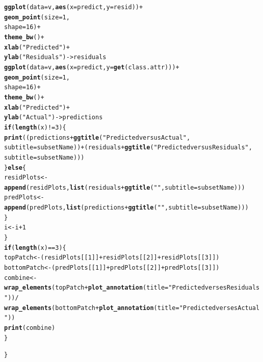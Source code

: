 \documentclass{article}\usepackage[]{graphicx}\usepackage[]{xcolor}
\makeatletter
\newcommand{\hlnum}[1]{\textcolor[rgb]{0.686,0.059,0.569}{#1}}%
\newcommand{\hlstr}[1]{\textcolor[rgb]{0.192,0.494,0.8}{#1}}%
\newcommand{\hlopt}[1]{\textcolor[rgb]{0,0,0}{#1}}%
\newcommand{\hlstd}[1]{\textcolor[rgb]{0.345,0.345,0.345}{#1}}%
\newcommand{\hlkwa}[1]{\textcolor[rgb]{0.161,0.373,0.58}{\textbf{#1}}}%
\newcommand{\hlkwb}[1]{\textcolor[rgb]{0.69,0.353,0.396}{#1}}%
\newcommand{\hlkwc}[1]{\textcolor[rgb]{0.333,0.667,0.333}{#1}}%
\newcommand{\hlkwd}[1]{\textcolor[rgb]{0.737,0.353,0.396}{\textbf{#1}}}%
\newenvironment{kframe}{%
 \def\at@end@of@kframe{}%
 \ifinner\ifhmode%
  \def\at@end@of@kframe{\end{minipage}}%
  \begin{minipage}{\columnwidth}%
 \fi\fi%
 \def\FrameCommand##1{\hskip\@totalleftmargin \hskip-\fboxsep
 \colorbox{shadecolor}{##1}\hskip-\fboxsep
     \hskip-\linewidth \hskip-\@totalleftmargin \hskip\columnwidth}%
 \MakeFramed {\advance\hsize-\width
   \@totalleftmargin\z@ \linewidth\hsize
   \@setminipage}}%
 {\par\unskip\endMakeFramed%
 \at@end@of@kframe}
\newenvironment{knitrout}{}{} %
\makeatother
\begin{document}
\begin{knitrout}
\begin{kframe}
\begin{alltt}
    \hlkwd{ggplot}\hlstd{(}\hlkwc{data}\hlstd{=v,} \hlkwd{aes}\hlstd{(}\hlkwc{x}\hlstd{=predict,} \hlkwc{y}\hlstd{=resid))} \hlopt{+}
      \hlkwd{geom_point}\hlstd{(}\hlkwc{size}\hlstd{=}\hlnum{1}\hlstd{,}
                 \hlkwc{shape}\hlstd{=}\hlnum{16}\hlstd{)}\hlopt{+}
      \hlkwd{theme_bw}\hlstd{()}\hlopt{+}
      \hlkwd{xlab}\hlstd{(}\hlstr{"Predicted"}\hlstd{)}\hlopt{+}
      \hlkwd{ylab}\hlstd{(}\hlstr{"Residuals"}\hlstd{)}\hlkwb{->} \hlstd{residuals}
    \hlkwd{ggplot}\hlstd{(}\hlkwc{data}\hlstd{=v,} \hlkwd{aes}\hlstd{(}\hlkwc{x}\hlstd{=predict,} \hlkwc{y}\hlstd{=}\hlkwd{get}\hlstd{(class.attr)))} \hlopt{+}
      \hlkwd{geom_point}\hlstd{(}\hlkwc{size}\hlstd{=}\hlnum{1}\hlstd{,}
                 \hlkwc{shape}\hlstd{=}\hlnum{16}\hlstd{)}\hlopt{+}
      \hlkwd{theme_bw}\hlstd{()}\hlopt{+}
      \hlkwd{xlab}\hlstd{(}\hlstr{"Predicted"}\hlstd{)}\hlopt{+}
      \hlkwd{ylab}\hlstd{(}\hlstr{"Actual"}\hlstd{)} \hlkwb{->} \hlstd{predictions}
    \hlkwa{if} \hlstd{(}\hlkwd{length}\hlstd{(x)} \hlopt{!=} \hlnum{3}\hlstd{) \{}
      \hlkwd{print}\hlstd{((predictions} \hlopt{+} \hlkwd{ggtitle}\hlstd{(}\hlstr{"Predicted versus Actual"}\hlstd{,}
           \hlkwc{subtitle}\hlstd{=subsetName))} \hlopt{+} \hlstd{(residuals} \hlopt{+} \hlkwd{ggtitle}\hlstd{(}\hlstr{"Predicted versus Residuals"}\hlstd{,}
           \hlkwc{subtitle}\hlstd{=subsetName)))}
    \hlstd{\}} \hlkwa{else} \hlstd{\{}
      \hlstd{residPlots} \hlkwb{<-} \hlkwd{append}\hlstd{(residPlots,} \hlkwd{list}\hlstd{(residuals} \hlopt{+} \hlkwd{ggtitle}\hlstd{(}\hlstr{""}\hlstd{,} \hlkwc{subtitle}\hlstd{=subsetName)))}
      \hlstd{predPlots} \hlkwb{<-} \hlkwd{append}\hlstd{(predPlots,} \hlkwd{list}\hlstd{(predictions} \hlopt{+} \hlkwd{ggtitle}\hlstd{(}\hlstr{""}\hlstd{,} \hlkwc{subtitle}\hlstd{=subsetName)))}
    \hlstd{\}}
    \hlstd{i} \hlkwb{<-} \hlstd{i} \hlopt{+} \hlnum{1}
  \hlstd{\}}
  \hlkwa{if} \hlstd{(}\hlkwd{length}\hlstd{(x)} \hlopt{==} \hlnum{3}\hlstd{) \{}
    \hlstd{topPatch} \hlkwb{<-} \hlstd{(residPlots[[}\hlnum{1}\hlstd{]]} \hlopt{+} \hlstd{residPlots[[}\hlnum{2}\hlstd{]]} \hlopt{+} \hlstd{residPlots[[}\hlnum{3}\hlstd{]])}
    \hlstd{bottomPatch} \hlkwb{<-} \hlstd{(predPlots[[}\hlnum{1}\hlstd{]]} \hlopt{+} \hlstd{predPlots[[}\hlnum{2}\hlstd{]]} \hlopt{+} \hlstd{predPlots[[}\hlnum{3}\hlstd{]])}
    \hlstd{combine} \hlkwb{<-} \hlkwd{wrap_elements}\hlstd{(topPatch} \hlopt{+} \hlkwd{plot_annotation}\hlstd{(}\hlkwc{title} \hlstd{=} \hlstr{"Predicted verses Residuals"}\hlstd{))} \hlopt{/}
                \hlkwd{wrap_elements}\hlstd{(bottomPatch} \hlopt{+} \hlkwd{plot_annotation}\hlstd{(}\hlkwc{title} \hlstd{=} \hlstr{"Predicted verses Actual"}\hlstd{))}
    \hlkwd{print}\hlstd{(combine)}
  \hlstd{\}}

\hlstd{\}}
\end{alltt}
\end{kframe}
\end{knitrout}
\end{document}
